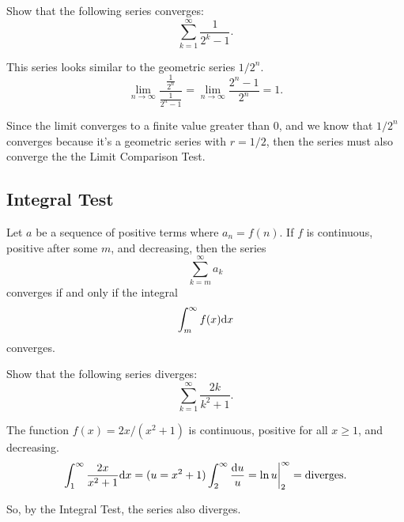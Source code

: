 \begin{example}
	Show that the following series converges:
	\begin{equation*}
		\sum_{k=1}^{\infty}{\frac{1}{2^k - 1}}.
	\end{equation*}
\end{example}
\begin{answer}
	This series looks similar to the geometric series $1/2^n$.
	\begin{equation*}
		\lim_{n\to\infty}{\frac{\frac{1}{2^n}}{\frac{1}{2^n-1}}} = \lim_{n\to\infty}{\frac{2^n - 1}{2^n}} = 1.
	\end{equation*}
	
	Since the limit converges to a finite value greater than 0, and we know that $1/2^n$ converges because it's a geometric series with $r=1/2$, then the series must also converge the the Limit Comparison Test.
\end{answer}

\subsection{Integral Test}
\begin{lemma}
	Let $a$ be a sequence of positive terms where $a_n = f(n)$.
	If $f$ is continuous, positive after some $m$, and decreasing, then the series
	\begin{equation*}
		\sum_{k=m}^{\infty}{a_k}
	\end{equation*}
	converges if and only if the integral
	\begin{equation*}
		\int_{m}^{\infty}{f(x)\mathrm{d} x}
	\end{equation*}
	converges.
\end{lemma}

\begin{example}
	Show that the following series diverges:
	\begin{equation*}
		\sum_{k=1}^{\infty}{\frac{2k}{k^2+1}}.
	\end{equation*}
\end{example}
\begin{answer}
	The function $f(x)=2x/(x^2+1)$ is continuous, positive for all $x \geq 1$, and decreasing.
	\begin{equation*}
		\int_{1}^{\infty}{\frac{2x}{x^2+1}\mathrm{d} x} = (u = x^2+1) \int_{2}^{\infty}{\frac{\mathrm{d} u}{u}} = \ln{u}\biggr\rvert_{2}^{\infty} = \text{diverges}.
	\end{equation*}
	
	So, by the Integral Test, the series also diverges.
\end{answer}

